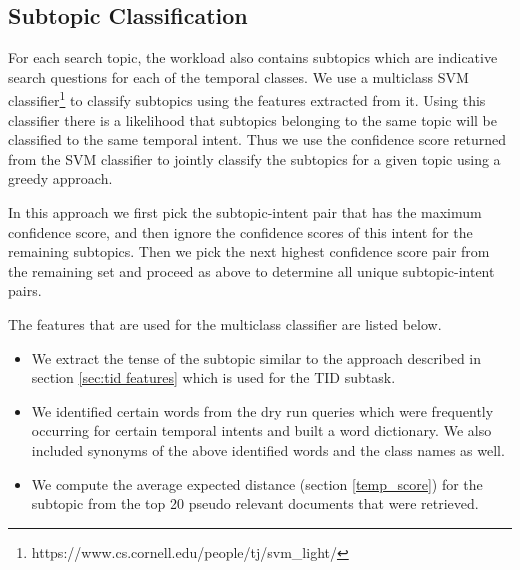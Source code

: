 \documentclass{sig-alternate}
\begin{document}
\subsection{Subtopic Classification}\label{subtopic_classify}
For each search topic, the workload also contains subtopics which are indicative search questions for each of the temporal classes. We use a multiclass SVM classifier\footnote{https://www.cs.cornell.edu/people/tj/svm\_light/} to classify subtopics using the features extracted from it. Using this classifier there is a likelihood that subtopics belonging to the same topic will be classified to the same temporal intent. Thus we use the confidence score returned from the SVM classifier to jointly classify the subtopics for a given topic using a greedy approach.

In this approach we first pick the subtopic-intent pair that has the maximum confidence score, and then ignore the confidence scores of this intent for the remaining subtopics. Then we pick the next highest confidence score pair from the remaining set and proceed as above to determine all unique subtopic-intent pairs.

The features that are used for the multiclass classifier are listed below.
\begin{itemize}
\item We extract the tense of the subtopic similar to the approach described in section \ref{sec:tid features} which is used for the TID subtask. 
\item We identified certain words from the dry run queries which were frequently occurring for certain temporal intents and built a word dictionary. We also included synonyms of the above identified words and the class names as well.
\item We compute the average expected distance (section \ref{temp_score}) for the subtopic from the top 20 pseudo relevant documents that were retrieved. 
\end{itemize}
\end{document}
